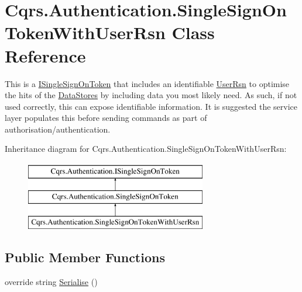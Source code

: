 \hypertarget{classCqrs_1_1Authentication_1_1SingleSignOnTokenWithUserRsn}{}\section{Cqrs.\+Authentication.\+Single\+Sign\+On\+Token\+With\+User\+Rsn Class Reference}
\label{classCqrs_1_1Authentication_1_1SingleSignOnTokenWithUserRsn}


This is a \hyperlink{interfaceCqrs_1_1Authentication_1_1ISingleSignOnToken}{I\+Single\+Sign\+On\+Token} that includes an identifiable \hyperlink{classCqrs_1_1Authentication_1_1SingleSignOnTokenWithUserRsn_a47d20dd286cf61cc23028e75cddcca79_a47d20dd286cf61cc23028e75cddcca79}{User\+Rsn} to optimise the hits of the \hyperlink{}{Data\+Stores} by including data you most likely need. As such, if not used correctly, this can expose identifiable information. It is suggested the service layer populates this before sending commands as part of authorisation/authentication.  


Inheritance diagram for Cqrs.\+Authentication.\+Single\+Sign\+On\+Token\+With\+User\+Rsn\+:\begin{figure}[H]
\begin{center}
\leavevmode
\includegraphics[height=3.000000cm]{classCqrs_1_1Authentication_1_1SingleSignOnTokenWithUserRsn}
\end{center}
\end{figure}
\subsection*{Public Member Functions}
\begin{DoxyCompactItemize}
\item 
override string \hyperlink{classCqrs_1_1Authentication_1_1SingleSignOnTokenWithUserRsn_a8103820e6352c10b3990fb027dd9b5ae_a8103820e6352c10b3990fb027dd9b5ae}{Serialise} ()
\end{DoxyCompactItemize}
